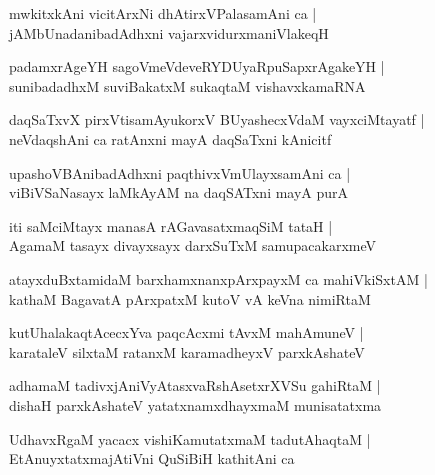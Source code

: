 \begin{shloka}
mwkitxkAni vicitArxNi dhAtirxVPalasamAni ca |\\
jAMbUnadanibadAdhxni vajarxvidurxmaniVlakeqH
\end{shloka}

\begin{shloka}
padamxrAgeYH sagoVmeVdeveRYDUyaRpuSapxrAgakeYH |\\
sunibadadhxM suviBakatxM sukaqtaM vishavxkamaRNA 
\end{shloka}

\begin{shloka}
daqSaTxvX pirxVtisamAyukorxV BUyashecxVdaM vayxciMtayatf |\\
neVdaqshAni ca ratAnxni mayA daqSaTxni kAnicitf 
\end{shloka}

\begin{shloka}
upashoVBAnibadAdhxni paqthivxVmUlayxsamAni ca |\\
viBiVSaNasayx laMkAyAM na daqSATxni mayA purA 
\end{shloka}

\begin{shloka}
iti saMciMtayx manasA rAGavasatxmaqSiM tataH |\\
AgamaM tasayx divayxsayx darxSuTxM samupacakarxmeV 
\end{shloka}

\begin{shloka}
atayxduBxtamidaM barxhamxnanxpArxpayxM ca mahiVkiSxtAM |\\
kathaM BagavatA pArxpatxM kutoV vA keVna nimiRtaM 
\end{shloka}

\begin{shloka}
kutUhalakaqtAcecxYva paqcAcxmi tAvxM mahAmuneV |\\
karataleV silxtaM ratanxM karamadheyxV parxkAshateV 
\end{shloka}

\begin{shloka}
adhamaM tadivxjAniVyAtasxvaRshAsetxrXVSu gahiRtaM |\\
dishaH parxkAshateV yatatxnamxdhayxmaM munisatatxma 
\end{shloka}

\begin{shloka}
UdhavxRgaM yacacx vishiKamutatxmaM tadutAhaqtaM |\\
EtAnuyxtatxmajAtiVni QuSiBiH kathitAni ca 
\end{shloka}

